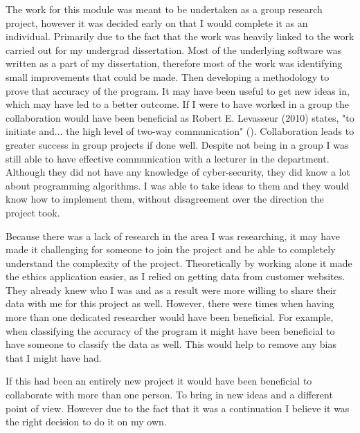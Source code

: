 The work for this module was meant to be undertaken as a group research project, however it was decided early on that I would complete it as an individual. Primarily due to the fact that the work was heavily linked to the work carried out for my undergrad dissertation. Most of the underlying software was written as a part of my dissertation, therefore most of the work was identifying small improvements that could be made. Then developing a methodology to prove that accuracy of the program. It may have been useful to get new ideas in, which may have led to a better outcome. If I were to have worked in a group the collaboration would have been beneficial as Robert E. Levasseur (2010) states, "to initiate and... the high level of two-way communication" (\cite{levasseur2010people}). Collaboration leads to greater success in group projects if done well. Despite not being in a group I was still able to have effective communication with a lecturer in the department. Although they did not have any knowledge of cyber-security, they did know a lot about programming algorithms. I was able to take ideas to them and they would know how to implement them, without disagreement over the direction the project took.

Because there was a lack of research in the area I was researching, it may have made it challenging for someone to join the project and be able to completely understand the complexity of the project. Theoretically by working alone it made the ethics application easier, as I relied on getting data from customer websites. They already knew who I was and as a result were more willing to share their data with me for this project as well. However, there were times when having more than one dedicated researcher would have been beneficial. For example, when classifying the accuracy of the program it might have been beneficial to have someone to classify the data as well. This would help to remove any bias that I might have had.

If this had been an entirely new project it would have been beneficial to collaborate with more than one person. To bring in new ideas and a different point of view. However due to the fact that it was a continuation I believe it was the right decision to do it on my own.  